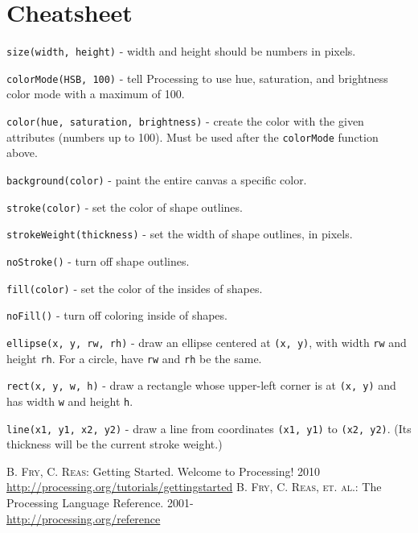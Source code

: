 \documentclass[
]{leaflet}
\begin{document}
\section{Cheatsheet}

\texttt{size(width, height)} - width and height should be numbers in pixels.

\texttt{colorMode(HSB, 100)} - tell Processing to use hue, saturation, and brightness color mode with a maximum of 100.

\texttt{color(hue, saturation, brightness)} - create the color with the given attributes (numbers up to 100).
Must be used after the \texttt{colorMode} function above.

\texttt{background(color)} - paint the entire canvas a specific color.

\texttt{stroke(color)} - set the color of shape outlines.

\texttt{strokeWeight(thickness)} - set the width of shape outlines, in pixels.

\texttt{noStroke()} - turn off shape outlines.

\texttt{fill(color)} - set the color of the insides of shapes.

\texttt{noFill()} - turn off coloring inside of shapes.

\texttt{ellipse(x, y, rw, rh)} - draw an ellipse centered at \texttt{(x, y)}, with width \texttt{rw} and height \texttt{rh}.
For a circle, have \texttt{rw} and \texttt{rh} be the same.

\texttt{rect(x, y, w, h)} - draw a rectangle whose upper-left corner is at \texttt{(x, y)} and has width \texttt{w} and height \texttt{h}.

\texttt{line(x1, y1, x2, y2)} - draw a line from coordinates \texttt{(x1, y1)} to \texttt{(x2, y2)}.
(Its thickness will be the current stroke weight.)


\begin{thebibliography}{000}
  \textsc{B. Fry, C. Reas}: Getting Started. Welcome to Processing! 2010\\
  \url{http://processing.org/tutorials/gettingstarted}
  \textsc{B. Fry, C. Reas, et. al.}: The Processing Language Reference. 2001-\\
  \url{http://processing.org/reference}
\end{thebibliography}

\loggingall
\end{document}
